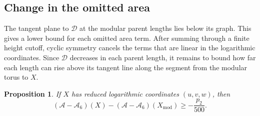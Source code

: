 \documentclass[10pt,twoside]{article}
\theoremstyle{plain}
\newtheorem{proposition}[theorem]{Proposition}
\theoremstyle{definition}
\theoremstyle{remark}
\newcommand{\A}{\mathcal A}
\newcommand{\Xmod}{X_{\mathrm{mod}}}
\begin{document}
\subsection{Change in the omitted area}
\label{sec:omitted-area}

The tangent plane to $\mathcal D$ at the modular parent lengths
lies below its graph. This gives a lower bound for each omitted area
term. After summing through a finite height cutoff, cyclic symmetry
cancels the terms that are linear in the logarithmic coordinates.
Since $\mathcal D$ decreases in each parent length, it remains to
bound how far each length can rise above its tangent line along
the segment from the modular torus to $X$.

\begin{proposition}
\label{prop:omitted-area-comparison}
If $X$ has reduced logarithmic coordinates $(u,v,w)$, then
$$
(\A-\A_6)(X)-(\A-\A_6)(\Xmod)\geq-\frac{p_2}{500}.
$$
\end{proposition}
\end{document}
